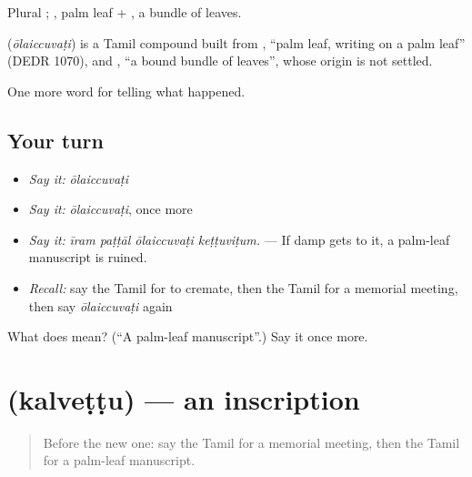 Plural ; , palm leaf + , a bundle of leaves.

\begin{cousinweb}
\textbf{} (\emph{ōlaiccuvaṭi}) is a Tamil compound built from , \textquotedblleft{}palm leaf, writing on a palm leaf\textquotedblright{} (DEDR 1070), and , \textquotedblleft{}a bound bundle of leaves\textquotedblright{}, whose origin is not settled.
\end{cousinweb}

\begin{grammarlens}[title={What you've built}]
One more word for telling what happened.
\end{grammarlens}

\subsection*{Your turn}
\begin{itemize}
\raggedright
  \item \emph{Say it:} \emph{ōlaiccuvaṭi}
  \item \emph{Say it:} \emph{ōlaiccuvaṭi}, once more
  \item \emph{Say it:} \emph{īram paṭṭāl ōlaiccuvaṭi keṭṭuviṭum.} — If damp gets to it, a palm-leaf manuscript is ruined.
  \item \emph{Recall:} say the Tamil for to cremate, then the Tamil for a memorial meeting, then say \emph{ōlaiccuvaṭi} again
\end{itemize}

\begin{tcolorbox}[breakable,colback=teal!4,colframe=teal!35!black,title={Before you move on}]
What does  mean? (\textquotedblleft{}A palm-leaf manuscript\textquotedblright{}.) Say it once more.
\end{tcolorbox}
\section[\texorpdfstring{\ta{கல்வெட்டு} (kalveṭṭu)}{கல்வெட்டு (kalveṭṭu)}]{ (kalveṭṭu) — an inscription}

\label{lesson:TA-C325-kalvettu}



\begin{quote}
Before the new one: say the Tamil for a memorial meeting, then the Tamil for a palm-leaf manuscript.
\end{quote}

